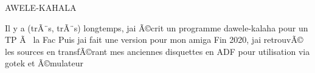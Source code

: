 \label{index_md_README}%
%
 AWELE-\/\+KAHALA

Il y a (trÃ¨s, trÃ¨s) longtemps, j\textquotesingle{}ai Ã©crit un programme d\textquotesingle{}awele-\/kalaha pour un TP Ã~ la Fac Puis j\textquotesingle{}ai fait une version pour mon amiga Fin 2020, j\textquotesingle{}ai retrouvÃ© les sources en transfÃ©rant mes anciennes disquettes en ADF pour utilisation via gotek et Ã©mulateur 